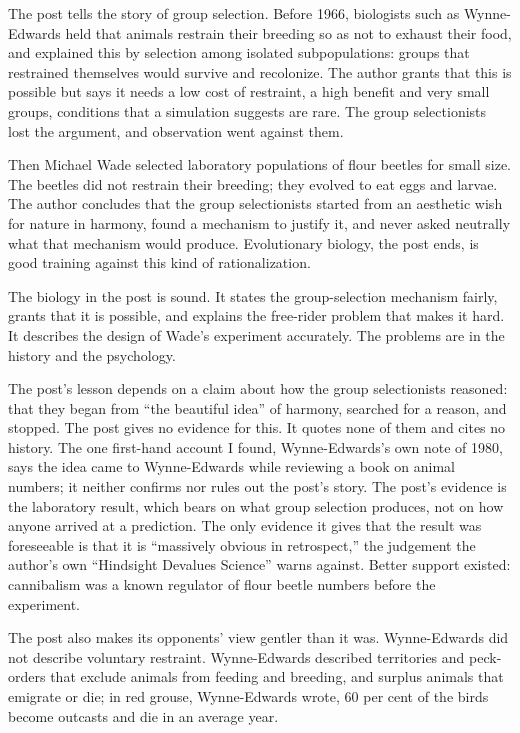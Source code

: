 \begin{afterword}
\summaryhead

The post tells the story of group selection. Before 1966, biologists such as Wynne-Edwards held that animals restrain their breeding so as not to exhaust their food, and explained this by selection among isolated subpopulations: groups that restrained themselves would survive and recolonize. The author grants that this is possible but says it needs a low cost of restraint, a high benefit and very small groups, conditions that a simulation suggests are rare. The group selectionists lost the argument, and observation went against them.

Then Michael Wade selected laboratory populations of flour beetles for small size. The beetles did not restrain their breeding; they evolved to eat eggs and larvae. The author concludes that the group selectionists started from an aesthetic wish for nature in harmony, found a mechanism to justify it, and never asked neutrally what that mechanism would produce. Evolutionary biology, the post ends, is good training against this kind of rationalization.

\responsehead

The biology in the post is sound. It states the group-selection mechanism fairly, grants that it is possible, and explains the free-rider problem that makes it hard. It describes the design of Wade's experiment accurately. The problems are in the history and the psychology.

The post's lesson depends on a claim about how the group selectionists reasoned: that they began from ``the beautiful idea'' of harmony, searched for a reason, and stopped. The post gives no evidence for this. It quotes none of them and cites no history. The one first-hand account I found, Wynne-Edwards's own note of 1980, says the idea came to Wynne-Edwards while reviewing a book on animal numbers; it neither confirms nor rules out the post's story. The post's evidence is the laboratory result, which bears on what group selection produces, not on how anyone arrived at a prediction. The only evidence it gives that the result was foreseeable is that it is ``massively obvious in retrospect,'' the judgement the author's own ``Hindsight Devalues Science'' warns against. Better support existed: cannibalism was a known regulator of flour beetle numbers before the experiment.

The post also makes its opponents' view gentler than it was. Wynne-Edwards did not describe voluntary restraint. Wynne-Edwards described territories and peck-orders that exclude animals from feeding and breeding, and surplus animals that emigrate or die; in red grouse, Wynne-Edwards wrote, 60 per cent of the birds become outcasts and die in an average year.


\end{afterword}

